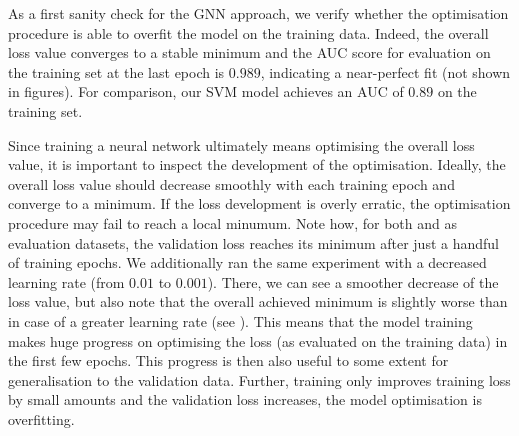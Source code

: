 \documentclass[
	fontsize=10pt, %
	twoside=true, %
	secnumdepth=1, %
  toc=indentunnumbered %
]{kaobook}
\begin{document}



As a first sanity check for the GNN approach, we verify whether the optimisation
procedure is able to overfit the model on the training data. Indeed, the overall
loss value converges to a stable minimum and the AUC score for evaluation on the
training set at the last epoch is $0.989$, indicating a near-perfect fit (not
shown in figures). For comparison, our SVM model achieves an AUC of $0.89$ on the
training set.


Since training a neural network ultimately means optimising the overall loss
value, it is important to inspect the development of the optimisation. Ideally,
the overall loss value should decrease smoothly with each training epoch and
converge to a minimum. If the loss development is overly erratic, the
optimisation procedure may fail to reach a local minumum. Note how, for both
\PDMap{} and \ReconMap{} as evaluation datasets, the validation loss reaches its
minimum after just a handful of training epochs. We additionally ran the same
experiment with a decreased learning rate (from $0.01$ to $0.001$). There, we
can see a smoother decrease of the loss value, but also note that the overall
achieved minimum is slightly worse than in case of a greater learning rate (see
). This means that the model training
makes huge progress on optimising the loss (as evaluated on the training data)
in the first few epochs. This progress is then also useful to some extent for
generalisation to the validation data. Further, training only improves training
loss by small amounts and the validation loss increases, the model optimisation
is overfitting.
\end{document}
